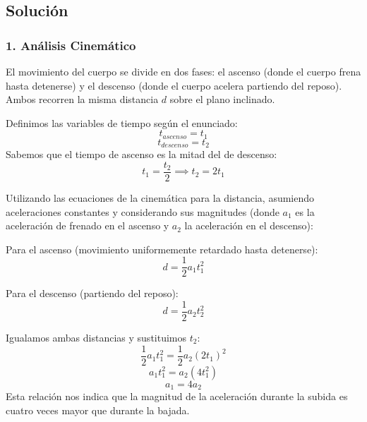 \documentclass[12pt, a4paper]{article}
\begin{document}
\begin{center}
\end{center}

\subsection*{Solución}

\subsubsection*{1. Análisis Cinemático}
El movimiento del cuerpo se divide en dos fases: el ascenso (donde el cuerpo frena hasta detenerse) y el descenso (donde el cuerpo acelera partiendo del reposo). Ambos recorren la misma distancia $d$ sobre el plano inclinado.

Definimos las variables de tiempo según el enunciado:
$$ t_{ascenso} = t_1 $$
$$ t_{descenso} = t_2 $$
Sabemos que el tiempo de ascenso es la mitad del de descenso:
$$ t_1 = \frac{t_2}{2} \implies t_2 = 2t_1 $$

Utilizando las ecuaciones de la cinemática para la distancia, asumiendo aceleraciones constantes y considerando sus magnitudes (donde $a_1$ es la aceleración de frenado en el ascenso y $a_2$ la aceleración en el descenso):

Para el ascenso (movimiento uniformemente retardado hasta detenerse):
$$ d = \frac{1}{2} a_1 t_1^2 $$

Para el descenso (partiendo del reposo):
$$ d = \frac{1}{2} a_2 t_2^2 $$

Igualamos ambas distancias y sustituimos $t_2$:
$$ \frac{1}{2} a_1 t_1^2 = \frac{1}{2} a_2 (2t_1)^2 $$
$$ a_1 t_1^2 = a_2 (4 t_1^2) $$
$$ a_1 = 4 a_2 $$
Esta relación nos indica que la magnitud de la aceleración durante la subida es cuatro veces mayor que durante la bajada.
\end{document}
